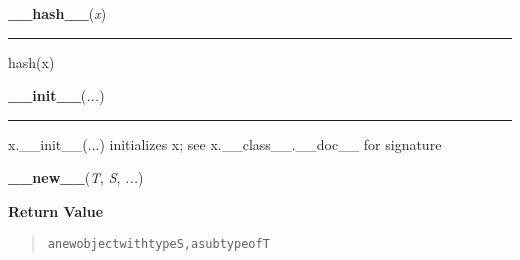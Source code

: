     \vspace{0.5ex}

    \begin{boxedminipage}{\textwidth}

    \raggedright \textbf{\_\_hash\_\_}(\textit{x})

    \vspace{-1.5ex}

    \rule{\textwidth}{0.5\fboxrule}

hash(x)
    \vspace{1ex}

    \end{boxedminipage}

    \label{object:__init__}

    \vspace{0.5ex}

    \begin{boxedminipage}{\textwidth}

    \raggedright \textbf{\_\_init\_\_}(\textit{...})

    \vspace{-1.5ex}

    \rule{\textwidth}{0.5\fboxrule}

x.{\_}{\_}init{\_}{\_}(...) initializes x; see x.{\_}{\_}class{\_}{\_}.{\_}{\_}doc{\_}{\_} for signature
    \vspace{1ex}

    \end{boxedminipage}

    \label{object:__new__}

    \vspace{0.5ex}

    \begin{boxedminipage}{\textwidth}

    \raggedright \textbf{\_\_new\_\_}(\textit{T}, \textit{S}, \textit{...})

      \textbf{Return Value}
      \begin{quote}
\begin{alltt}
a new object with type S, a subtype of T
\end{alltt}

      \end{quote}

    \vspace{1ex}

    \end{boxedminipage}


